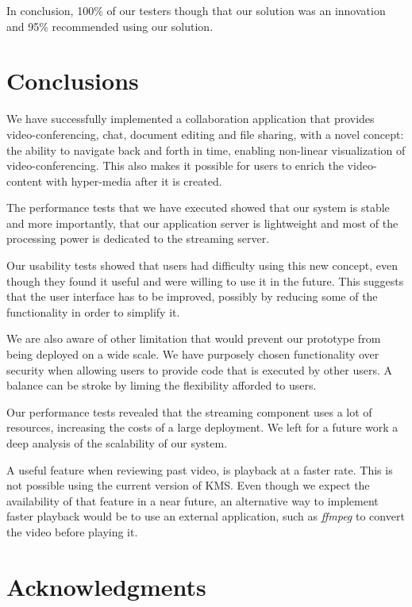 \documentclass[10pt,conference]{IEEEtran}
\begin{document}
In conclusion, 100\% of our testers though that our solution was an innovation and 95\% recommended using our solution.




\section{Conclusions}
\label{chapter:conclusion}

We have successfully implemented a collaboration application that provides video-conferencing, chat, document editing and file sharing, with a novel concept: the ability to navigate back and forth in time, enabling non-linear visualization of video-conferencing.
This also makes it possible for users to enrich the video-content with hyper-media after it is created.

The performance tests that we have executed showed that our system is stable and more importantly, that our application server is lightweight and most of the processing power is dedicated to the streaming server.

Our usability tests showed that users had difficulty using this new concept, even though they found it useful and were willing to use it in the future.
This suggests that the user interface has to be improved, possibly by reducing some of the functionality in order to simplify it.

We are also aware of other limitation that would prevent our prototype from being deployed on a wide scale.
We have purposely chosen functionality over security when allowing users to provide code that is executed by other users.
A balance can be stroke by liming the flexibility afforded to users.

Our performance tests revealed that the streaming component uses a lot of resources, increasing the costs of a large deployment.
We left for a future work a deep analysis of the scalability of our system.

A useful feature when reviewing past video, is playback at a faster rate.
This is not possible using the current version of \gls{KMS}.
Even though we expect the availability of that feature in a near future, an alternative way to implement faster playback would be to use an external application, such as \emph{ffmpeg} to convert the video before playing it.

\section*{Acknowledgments}
\end{document}
